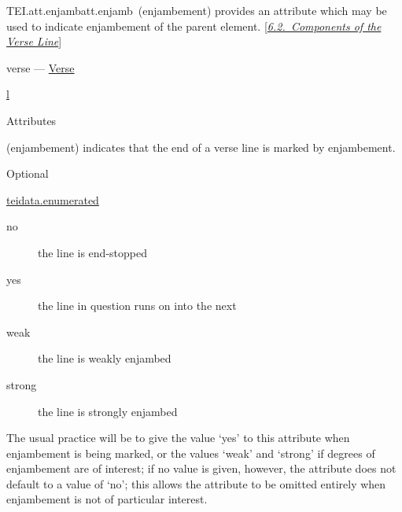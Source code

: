 \begin{reflist}
\item[]\begin{specHead}{TEI.att.enjamb}{att.enjamb} (enjambement) provides an attribute which may be used to indicate enjambement of the parent element. [\textit{\hyperref[VESE]{6.2.\ Components of the Verse Line}}]\end{specHead} 
    \item[{Module}]
  verse — \hyperref[VE]{Verse}
    \item[{Members}]
  \hyperref[TEI.l]{l}
    \item[{Attributes}]
  Attributes\hfil\\[-10pt]\begin{sansreflist}
    \item[@enjamb]
  (enjambement) indicates that the end of a verse line is marked by enjambement.
\begin{reflist}
    \item[{Status}]
  Optional
    \item[{Datatype}]
  \hyperref[TEI.teidata.enumerated]{teidata.enumerated}
    \item[{Sample values include:}]
  \begin{description}

\item[{no}]the line is end-stopped
\item[{yes}]the line in question runs on into the next
\item[{weak}]the line is weakly enjambed
\item[{strong}]the line is strongly enjambed
\end{description} 
    \item[{Note}]
  \par
The usual practice will be to give the value ‘yes’ to this attribute when enjambement is being marked, or the values ‘weak’ and ‘strong’ if degrees of enjambement are of interest; if no value is given, however, the attribute does not default to a value of ‘no’; this allows the attribute to be omitted entirely when enjambement is not of particular interest.
\end{reflist}  
\end{sansreflist}  
\end{reflist}  
